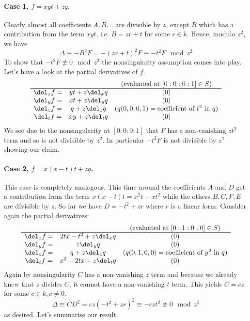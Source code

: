 \paragraph{Case 1, $f = xyt + zq$.} 
Clearly almost all coefficients $A,B,..$ are divisible by $z$, except $B$ which has a contribution from the term $xyt$, i.e. $B = zr + t$ for some $r\in k$.
Hence, modulo $z^2$, we have
\begin{equation}
\Delta \equiv -B^2F = -(zr+t)^2F \equiv -t^2F \mod z^2
\end{equation}
To show that $-t^2F \not\equiv 0 \mod z^2$ the nonsingularity assumption comes into play.
Let's have a look at the partial derivatives of $f$.
\begin{equation}
\begin{matrix}
         &  & \text{(evaluated at $[0:0:0:1] \in S$)} \\
\hline
\del_x f =& yt + z\del_x q & (0) \\
\del_y f =& xt + z\del_y q & (0) \\
\del_z f =& q + z\del_z q & (q(0,0,0,1) = \text{coefficient of $t^2$ in $q$}) \\
\del_t f =& xy + z\del_t q & (0)
\end{matrix}
\end{equation}
We see due to the nonsingularity at $[0:0:0:1]$ that $F$ has a non-vanishing $zt^2$ term and so is not divisible by $z^2$.
In particular $-t^2F$ is not divisible by $z^2$ showing our claim.

\paragraph{Case 2, $f = x(x-t)t + zq$.}
This case is completely analogous.
This time around the coefficients $A$ and $D$ get a contribution from the term $x(x-t)t = x^2t - xt^2$ while the others $B,C,F,E$ are divisible by $z$.
So far we have $D = -t^2 + zr$ where $r$ is a linear form.
Consider again the partial derivatives:
\begin{equation}
\begin{matrix}
         &  & \text{(evaluated at $[0:1:0:0] \in S$)} \\
\hline
\del_x f =& 2tx - t^2 + z\del_x q & (0) \\
\del_y f =& z\del_y q & (0) \\
\del_z f =& q + z\del_z q & (q(0,1,0,0) = \text{coefficient of $y^2$ in $q$}) \\
\del_t f =& x^2 - 2tx + z\del_t q & (0)
\end{matrix}
\end{equation}
Again by nonsingularity $C$ has a non-vanishing $z$ term and because we already knew that $z$ divides $C$, it cannot have a non-vanishing $t$ term.
This yields $C = cz$ for some $c\in k, c \neq 0$.
\begin{equation}
\Delta \equiv CD^2 = cz(-t^2+zr)^2 \equiv -czt^2  \not\equiv 0 \mod z^2
\end{equation}
as desired. Let's summarise our result.

